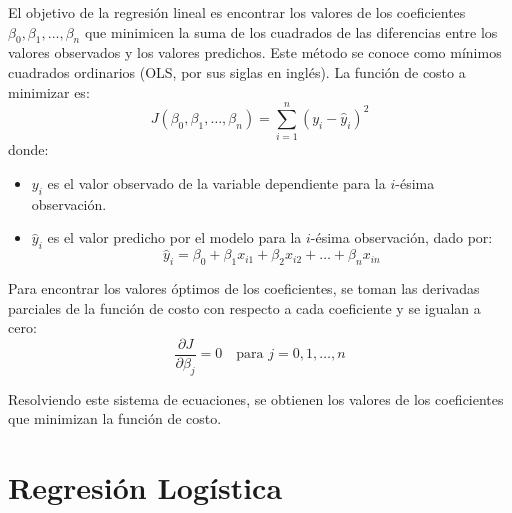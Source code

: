 El objetivo de la regresión lineal es encontrar los valores de los coeficientes $\beta_0, \beta_1, \ldots, \beta_n$ que minimicen la suma de los cuadrados de las diferencias entre los valores observados y los valores predichos. Este método se conoce como mínimos cuadrados ordinarios (OLS, por sus siglas en inglés). La función de costo a minimizar es:
\begin{equation}
J\left(\beta_0, \beta_1, \ldots, \beta_n\right) = \sum_{i=1}^{n}\left(y_i - \hat{y}_i\right)^2
\end{equation}
donde:
\begin{itemize}
    \item $y_i$ es el valor observado de la variable dependiente para la $i$-ésima observación.
    \item $\hat{y}_i$ es el valor predicho por el modelo para la $i$-ésima observación, dado por:
    \begin{equation}
    \hat{y}_i = \beta_0 + \beta_1 x_{i1} + \beta_2 x_{i2} + \ldots + \beta_n x_{in}
    \end{equation}
\end{itemize}

Para encontrar los valores óptimos de los coeficientes, se toman las derivadas parciales de la función de costo con respecto a cada coeficiente y se igualan a cero:
\begin{equation}
\frac{\partial J}{\partial \beta_j} = 0 \quad \text{para } j = 0, 1, \ldots, n
\end{equation}

Resolviendo este sistema de ecuaciones, se obtienen los valores de los coeficientes que minimizan la función de costo.

\section{Regresión Logística}

